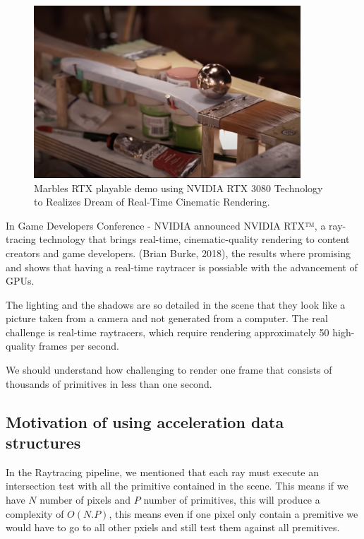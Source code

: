 \documentclass[11pt,a4paper]{article}
\begin{document}
\begin{figure}[h]	
     \centering
     \captionsetup{justification=centering,margin=2cm}
     \includegraphics[width=10cm]{images/marbel_brush.png}
     \caption{Marbles RTX playable demo using NVIDIA RTX 3080 Technology to Realizes Dream of Real-Time Cinematic Rendering.\protect\cite{Burke2018}}
        \label{fig:dice}
\end{figure}

In Game Developers Conference - NVIDIA announced NVIDIA RTX™, a ray-tracing technology that brings real-time, cinematic-quality rendering to content creators and game developers. (Brian Burke, 2018), the results where promising and shows that having a real-time raytracer is possiable with the advancement of GPUs. 
\\
\noindent

The lighting and the shadows are so detailed in the scene that they look like a picture taken from a camera and not generated from a computer. The real challenge is real-time raytracers, which require rendering approximately 50 high-quality frames per second.
\\
\noindent

We should understand how challenging to render one frame that consists of thousands of primitives in less than one second. 

\subsection{Motivation of using acceleration data structures}
In the Raytracing pipeline, we mentioned that each ray must execute an intersection test with all the primitive contained in the scene.  This means if we have $N$ number of pixels and $P$ number of primitives, this will produce a complexity of $O(N.P)$, this means even if one pixel only contain a premitive we would have to go to all other pxiels and still test them against all premitives. 
\\
\noindent
\end{document}
